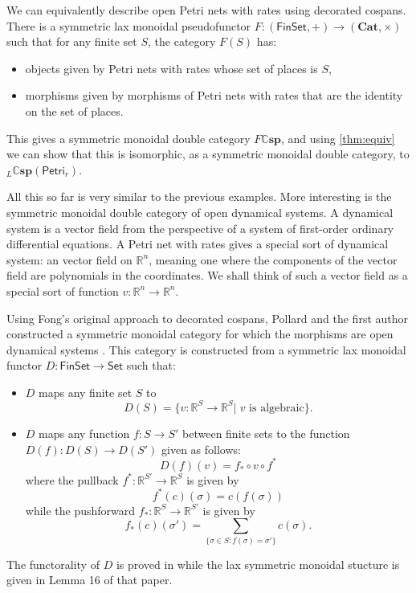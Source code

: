 \documentclass[reqno]{amsart}
\newcommand{\R}{\mathbb{R}}
\let\maps\colon
\theoremstyle{definition}
\theoremstyle{remark}
\newcommand{\Set}{\mathsf{Set}}
\newcommand{\Petri}{\mathsf{Petri}}
\newcommand{\Fin}{\mathsf{Fin}}
\newcommand{\bicat}{\mathbf}
\newcommand{\Cat}{\bicat{Cat}}
\newcommand{\double}[1]{\mathbf{\mathbb #1}}
\newcommand{\lCsp}{\double{Csp}}
\newcommand{\define}[1]{{\bf \boldmath{#1}}}
\begin{document}
We can equivalently describe open Petri nets with rates using decorated cospans.  There is a symmetric lax monoidal pseudofunctor $F \maps (\Fin\Set, +) \to (\Cat, \times)$ such that for any finite set $S$, the category $F(S)$ has:
\begin{itemize}
\item objects given by Petri nets with rates whose set of places is $S$,
\item morphisms given by morphisms of Petri nets with rates that are the identity on the set of places.
\end{itemize}
This gives a symmetric monoidal double category $F \lCsp$, and using \cref{thm:equiv} we can show that this is isomorphic, as a symmetric monoidal double category, to ${}_L \lCsp(\Petri_r)$.

All this so far is very similar to the previous examples.  More interesting is the symmetric monoidal double category of open dynamical systems.   A dynamical system is a vector field from the perspective of a system of first-order ordinary differential equations. A Petri net with rates gives a special sort of dynamical system: an \define{algebraic} vector field on $\R^n$, meaning one where the components of the vector field are polynomials in the coordinates. We shall think of such a vector field as a special sort of function $v \maps \R^n \to \R^n$.

Using Fong's original approach to decorated cospans, Pollard and the first author constructed a symmetric monoidal category for which the morphisms are open dynamical systems \cite[Theorem 17]{BP}.  This category is constructed from a symmetric lax monoidal functor 
$D \maps \Fin\Set \to \Set$ such that:
\begin{itemize}
\item $D$ maps any finite set $S$ to 
\[ D(S) = \{ v \maps \R^S \to \R^S | \; v \textrm{ is algebraic}  \}. \]
\item $D$ maps any function $f \maps S \to S'$ between finite sets to the function $D(f) \maps D(S) \to D(S')$ given as follows:
\[ D(f)(v) = f_* \circ v \circ f^* \]
where the pullback $ f^* \maps \R^{S'} \to \R^S $ is given by
\[ f^*(c)(\sigma) = c(f(\sigma)) \] 
while the pushforward $ f_* \maps \R^{S} \to \R^{S'} $ is given by
\[ f_*(c)(\sigma') = \sum_{ \{ \sigma \in S : f(\sigma) = \sigma' \} } c(\sigma). \]
\end{itemize}
The functorality of $D$ is proved in \cite[Lemma 15]{BP} while the lax symmetric monoidal stucture is given in Lemma 16 of that paper.
\end{document}
